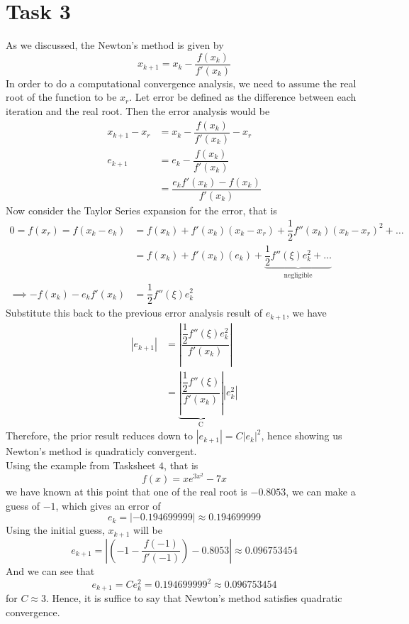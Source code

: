 \documentclass{article}
\begin{document}
\section*{Task 3}
As we discussed, the Newton's method is given by 
$$x_{k+1} = x_k - \dfrac{f\left(x_k\right)}{f'\left(x_k\right)}$$
In order to do a computational convergence analysis, we need to assume the real root of the function to be $x_r$. Let error be defined as the difference between each iteration and the real root. Then the error analysis would be
\begin{align*}
x_{k+1} - x_r &= x_k - \dfrac{f\left(x_k\right)}{f'\left(x_k\right)} - x_r\\
e_{k+1} & = e_k - \dfrac{f\left(x_k\right)}{f'\left(x_k\right)} \\
		& = \dfrac{e_kf'\left(x_k\right) - f\left(x_k\right)}{f'\left(x_k\right)} 
\end{align*}
Now consider the Taylor Series expansion for the error, that is
\begin{align*}
0 = f\left(x_r\right) = f\left(x_k - e_k\right) &= f\left(x_k\right) + f'\left(x_k\right)\left(x_k - x_r\right) + \dfrac{1}{2}f''(x_k)\left(x_k - x_r\right)^2+ \dots\\
& = f\left(x_k\right) + f'\left(x_k\right)\left(e_k\right) + \underbrace{\dfrac{1}{2}f''\left(\xi\right)e_k^2+ \dots}_{\text{negligible}}\\
\implies -f\left(x_k\right) - e_k f'\left(x_k\right)& = \dfrac{1}{2}f''\left(\xi\right)e_k^2
\end{align*}
Substitute this back to the previous error analysis result of $e_{k+1}$, we have
\begin{align*}
\left|e_{k+1}\right| &= \left|\dfrac{\dfrac{1}{2}f''\left(\xi\right)e_k^2}{f'\left(x_k\right)}\right|\\
				&= \underbrace{\left|\dfrac{\dfrac{1}{2}f''\left(\xi\right)}{f'\left(x_k\right)}\right|}_{\text{C}}\left|e_k^2\right|
\end{align*}
Therefore, the prior result reduces down to $\left|e_{k+1}\right|  = C \left|e_k\right|^2$, hence showing us Newton's method is quadraticly convergent. \\
Using the example from Tasksheet $4$, that is
$$f(x) = xe^{3x^2} - 7x$$
we have known at this point that one of the real root is $-0.8053$, we can make a guess of $-1$, which gives an error of 
$$e_k = \left|-0.194699999\right| \approx 0.194699999$$
Using the initial guess, $x_{k+1}$ will be
$$e_{k+1} = \left|\left(-1 - \dfrac{f(-1)}{f'(-1)}\right) -0.8053 \right|\approx 0.096753454$$
And we can see that 
$$ e_{k+1} = C e_k^2= 0.194699999^2 \approx 0.096753454$$
for $C \approx 3 $. Hence, it is suffice to say that Newton's method satisfies quadratic convergence.
\end{document}
